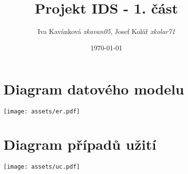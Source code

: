 \documentclass[12pt,titlepage,a4paper]{extarticle}
\title{Projekt IDS - 1. část}
\author{Iva Kavánková \emph{xkavan05}, Josef Kolář \emph{xkolar71}}
\date{\today}
\begin{document}

\pagestyle{fancy}
{
	\titleformat{\section}[block]{\Large\bfseries\filcenter}{}{0pt}{}
	\begin{landscape}

		\begin{figure}[h]
			\section{Diagram datového modelu}
			\centering
			\texttt{[image: assets/er.pdf]}
		\end{figure}

		\begin{figure}[h]
			\section{Diagram případů užití}
			\centering
			\texttt{[image: assets/uc.pdf]}
		\end{figure}
	\end{landscape}
	
}
\end{document}
